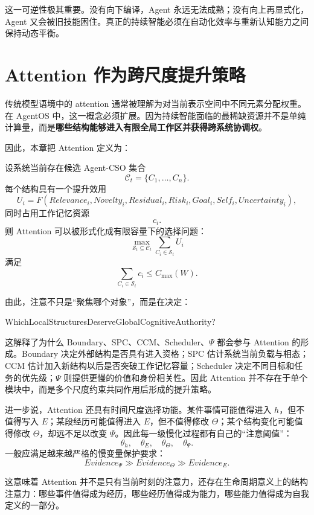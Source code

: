 这一可逆性极其重要。没有向下编译，Agent 永远无法成熟；没有向上再显式化，Agent 又会被旧技能困住。真正的持续智能必须在自动化效率与重新认知能力之间保持动态平衡。


\section{Attention 作为跨尺度提升策略}

传统模型语境中的 attention 通常被理解为对当前表示空间中不同元素分配权重。在 AgentOS 中，这一概念必须扩展。因为持续智能面临的最稀缺资源并不是单纯计算量，而是\textbf{哪些结构能够进入有限全局工作区并获得跨系统协调权}。

因此，本章把 Attention 定义为：
\begin{statementbox}
\centering
{}
\end{statementbox}

设系统当前存在候选 Agent-CSO 集合
\[
\mathcal C_t
=
\{C_1,\ldots,C_n\}.
\]
每个结构具有一个提升效用
\[
U_i
=
F
\left(
Relevance_i,
Novelty_i,
Residual_i,
Risk_i,
Goal_i,
Self_i,
Uncertainty_i
\right),
\]
同时占用工作记忆资源
\[
c_i.
\]
则 Attention 可以被形式化成有限容量下的选择问题：
\[
\max_{\mathcal S_t\subseteq\mathcal C_t}
\sum_{C_i\in\mathcal S_t}U_i
\]
满足
\[
\sum_{C_i\in\mathcal S_t}c_i
\le
C_{\max}(W).
\]

由此，注意不只是“聚焦哪个对象”，而是在决定：
\begin{statementbox}
WhichLocalStructuresDeserveGlobalCognitiveAuthority?
\end{statementbox}

这解释了为什么 Boundary、SPC、CCM、Scheduler、$\Psi$ 都会参与 Attention 的形成。Boundary 决定外部结构是否具有进入资格；SPC 估计系统当前负载与相态；CCM 估计加入新结构以后是否突破工作记忆容量；Scheduler 决定不同目标和任务的优先级；$\Psi$ 则提供更慢的价值和身份相关性。因此 Attention 并不存在于单个模块中，而是多个尺度约束共同作用后形成的提升策略。

进一步说，Attention 还具有时间尺度选择功能。某件事情可能值得进入 $h$，但不值得写入 $E$；某段经历可能值得进入 $E$，但不值得修改 $\Theta$；某个结构变化可能值得修改 $\Theta$，却远不足以改变 $\Psi$。因此每一级慢化过程都有自己的“注意阈值”：
\[
\theta_h,
\quad
\theta_E,
\quad
\theta_\Theta,
\quad
\theta_\Psi.
\]
一般应满足越来越严格的慢变量保护要求：
\[
Evidence_{\Psi}
\gg
Evidence_{\Theta}
\gg
Evidence_E.
\]

这意味着 Attention 并不是只有当前时刻的注意力，还存在生命周期意义上的结构注意力：哪些事件值得成为经历，哪些经历值得成为能力，哪些能力值得成为自我定义的一部分。


